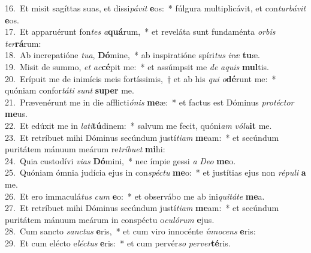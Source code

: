 {16.~}Et misit sagíttas suas, et dissi\textit{pá}\textit{vit} \textbf{e}os:~* fúlgura multiplicávit, et con\textit{tur}\textit{bá}\textit{vit} \textbf{e}os.\\
{17.~}Et apparuérunt fon\textit{tes} \textit{a}\textbf{quá}rum,~* et reveláta sunt fundaménta \textit{or}\textit{bis} \textit{ter}\textbf{rá}rum:\\
{18.~}Ab increpatióne \textit{tu}\textit{a}, \textbf{Dó}mine,~* ab inspiratióne spíri\textit{tus} \textit{i}\textit{ræ} \textbf{tu}æ.\\
{19.~}Misit de summo, \textit{et} \textit{ac}\textbf{cé}pit me:~* et assúmpsit me \textit{de} \textit{a}\textit{quis} \textbf{mul}tis.\\
{20.~}Erípuit me de inimícis meis fortíssimis,~† et ab his \textit{qui} \textit{o}\textbf{dé}runt me:~* quóniam confor\textit{tá}\textit{ti} \textit{sunt} \textbf{su}\textbf{per} me.\\
{21.~}Prævenérunt me in die afflicti\textit{ó}\textit{nis} \textbf{me}æ:~* et factus est Dóminus \textit{pro}\textit{té}\textit{ctor} \textbf{me}us.\\
{22.~}Et edúxit me in \textit{la}\textit{ti}\textbf{tú}dinem:~* salvum me fecit, quóni\textit{am} \textit{vó}\textit{lu}\textbf{it} me.\\
{23.~}Et retríbuet mihi Dóminus secúndum justí\textit{ti}\textit{am} \textbf{me}am:~* et secúndum puritátem mánuum meárum re\textit{trí}\textit{bu}\textit{et} \textbf{mi}hi:\\
{24.~}Quia custodívi \textit{vi}\textit{as} \textbf{Dó}mini,~* nec ímpie gessi \textit{a} \textit{De}\textit{o} \textbf{me}o.\\
{25.~}Quóniam ómnia judícia ejus in con\textit{spé}\textit{ctu} \textbf{me}o:~* et justítias ejus non \textit{ré}\textit{pu}\textit{li} \textbf{a} me.\\
{26.~}Et ero immaculá\textit{tus} \textit{cum} \textbf{e}o:~* et observábo me ab ini\textit{qui}\textit{tá}\textit{te} \textbf{me}a.\\
{27.~}Et retríbuet mihi Dóminus secúndum justí\textit{ti}\textit{am} \textbf{me}am:~* et secúndum puritátem mánuum meárum in conspéctu o\textit{cu}\textit{ló}\textit{rum} \textbf{e}jus.\\
{28.~}Cum sancto \textit{san}\textit{ctus} \textbf{e}ris,~* et cum viro innocénte \textit{ín}\textit{no}\textit{cens} \textbf{e}ris:\\
{29.~}Et cum elécto e\textit{lé}\textit{ctus} \textbf{e}ris:~* et cum pervér\textit{so} \textit{per}\textit{ver}\textbf{té}ris.\\
